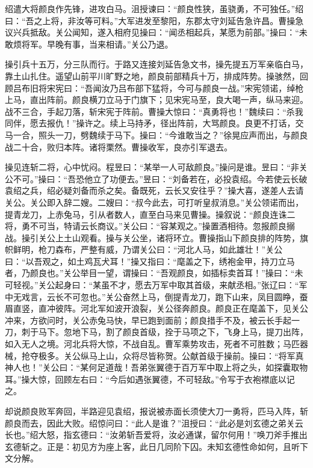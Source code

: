 绍遣大将颜良作先锋，进攻白马。沮授谏曰：“颜良性狭，虽骁勇，不可独任。”绍曰：“吾之上将，非汝等可料。”大军进发至黎阳，东郡太守刘延告急许昌。曹操急议兴兵抵敌。关公闻知，遂入相府见操曰：“闻丞相起兵，某愿为前部。”操曰：“未敢烦将军。早晚有事，当来相请。”关公乃退。

操引兵十五万，分三队而行。于路又连接刘延告急文书，操先提五万军亲临白马，靠土山扎住。遥望山前平川旷野之地，颜良前部精兵十万，排成阵势。操骇然，回顾吕布旧将宋宪曰：“吾闻汝乃吕布部下猛将，今可与颜良一战。”宋宪领诺，绰枪上马，直出阵前。颜良横刀立马于门旗下；见宋宪马至，良大喝一声，纵马来迎。战不三合，手起刀落，斩宋宪于阵前。曹操大惊曰：“真勇将也！”魏续曰：“杀我同伴，愿去报仇！”操许之。续上马持矛，径出阵前，大骂颜良。良更不打话，交马一合，照头一刀，劈魏续于马下。操曰：“今谁敢当之？”徐晃应声而出，与颜良战二十合，败归本阵。诸将栗然。曹操收军，良亦引军退去。

操见连斩二将，心中忧闷。程昱曰：“某举一人可敌颜良。”操问是谁。昱曰：“非关公不可。”操曰：“吾恐他立了功便去。”昱曰：“刘备若在，必投袁绍。今若使云长破袁绍之兵，绍必疑刘备而杀之矣。备既死，云长又安往乎？”操大喜，遂差人去请关公。关公即入辞二嫂。二嫂曰：“叔今此去，可打听皇叔消息。”关公领诺而出，提青龙刀，上赤兔马，引从者数人，直至白马来见曹操。操叙说：“颜良连诛二将，勇不可当，特请云长商议。”关公曰：“容某观之。”操置酒相待。忽报颜良搦战。操引关公上土山观看。操与关公坐，诸将环立。曹操指山下颜良排的阵势，旗帜鲜明，枪刀森布，严整有威，乃谓关公曰：“河北人马，如此雄壮！”关公曰：“以吾观之，如土鸡瓦犬耳！”操又指曰：“麾盖之下，绣袍金甲，持刀立马者，乃颜良也。”关公举目一望，谓操曰：“吾观颜良，如插标卖首耳！”操曰：“未可轻视。”关公起身曰：“某虽不才，愿去万军中取其首级，来献丞相。”张辽曰：“军中无戏言，云长不可忽也。”关公奋然上马，倒提青龙刀，跑下山来，凤目圆睁，蚕眉直竖，直冲彼阵。河北军如波开浪裂，关公径奔颜良。颜良正在麾盖下，见关公冲来，方欲问时，关公赤兔马快，早已跑到面前；颜良措手不及，被云长手起一刀，刺于马下。忽地下马，割了颜良首级，拴于马项之下，飞身上马，提刀出阵，如入无人之境。河北兵将大惊，不战自乱。曹军乘势攻击，死者不可胜数；马匹器械，抢夺极多。关公纵马上山，众将尽皆称贺。公献首级于操前。操曰：“将军真神人也！”关公曰：“某何足道哉！吾弟张翼德于百万军中取上将之头，如探囊取物耳。”操大惊，回顾左右曰：“今后如遇张翼德，不可轻敌。”令写于衣袍襟底以记之。

却说颜良败军奔回，半路迎见袁绍，报说被赤面长须使大刀一勇将，匹马入阵，斩颜良而去，因此大败。绍惊问曰：“此人是谁？”沮授曰：“此必是刘玄德之弟关云长也。”绍大怒，指玄德曰：“汝弟斩吾爱将，汝必通谋，留尔何用！”唤刀斧手推出玄德斩之。正是：初见方为座上客，此日几同阶下囚。未知玄德性命如何，且听下文分解。